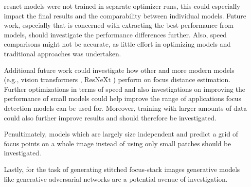 \Ac{resnet} models were not trained in separate optimizer runs, this could especially impact the final results and the comparability between individual models. Future work, especially that is concerned with extracting the best performance from models, should investigate the performance differences further. 
Also, speed comparisons might not be accurate, as little effort in optimizing models and traditional approaches was undertaken.

Additional future work could investigate how other and more modern models (e.g., vision transformers \cite{dosovitskiy2021image}, ResNeXt \cite{xie2017aggregated}) perform on focus distance estimation. Further optimizations in terms of speed and also investigations on improving the performance of small models could help improve the range of applications focus detection models can be used for.
Moreover, training with larger amounts of data could also further improve results and should therefore be investigated.

Penultimately, models which are largely size independent and predict a grid of focus points on a whole image instead of using only small patches should be investigated.

Lastly, for the task of generating stitched focus-stack images generative models like generative adversarial networks \cite{goodfellow2014generative} are a potential avenue of investigation.